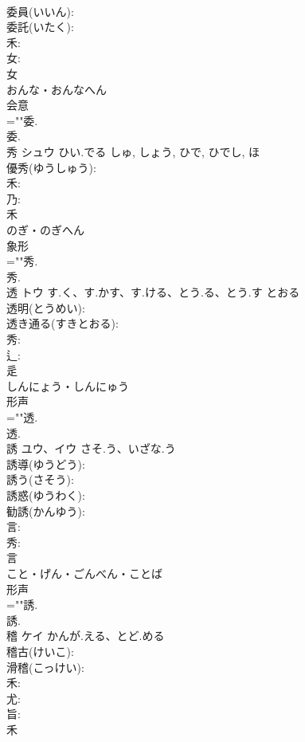 \documentclass[8pt]{extreport}
\begin{document}
\begin{CJK}{UTF8}{min}
\\	委員(いいん): 
\\	委託(いたく): 
\\	禾: 
\\	女: 
\\	女	
\\	おんな・おんなへん	
\\	会意 
\\	=""委.
\\	委.
\\	秀	シュウ	ひい.でる	しゅ, しょう, ひで, ひでし, ほ	
\\	優秀(ゆうしゅう): 
\\	禾: 
\\	乃: 
\\	禾	
\\	のぎ・のぎへん	
\\	象形 
\\	=""秀.
\\	秀.
\\	透	トウ	す.く、す.かす、す.ける、とう.る、とう.す	とおる	
\\	透明(とうめい): 
\\	透き通る(すきとおる): 
\\	秀: 
\\	辶: 
\\	辵	
\\	しんにょう・しんにゅう	
\\	形声 
\\	=""透.
\\	透.
\\	誘	ユウ、イウ	さそ.う、いざな.う		
\\	誘導(ゆうどう): 
\\	誘う(さそう): 
\\	誘惑(ゆうわく): 
\\	勧誘(かんゆう): 
\\	言: 
\\	秀: 
\\	言	
\\	こと・げん・ごんべん・ことば	
\\	形声 
\\	=""誘.
\\	誘.
\\	稽	ケイ	かんが.える、とど.める		
\\	稽古(けいこ): 
\\	滑稽(こっけい): 
\\	禾: 
\\	尤: 
\\	旨: 
\\	禾	

\end{CJK}
\end{document}

